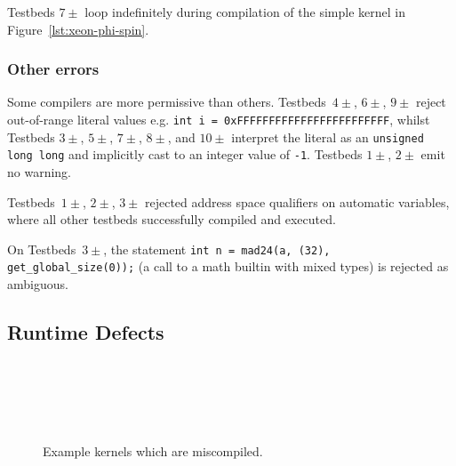 Testbeds $7\pm$ loop indefinitely during compilation of the simple kernel in
Figure~\ref{lst:xeon-phi-spin}.

\subsubsection{Other errors}

Some compilers are more permissive than others. Testbeds~$4\pm$, $6\pm$, $9\pm$
reject out-of-range literal values e.g. \texttt{int i =
0xFFFFFFFFFFFFFFFFFFFFFFFF}, whilst Testbeds $3\pm$, $5\pm$, $7\pm$, $8\pm$, and
$10\pm$ interpret the literal as an \texttt{unsigned long long} and implicitly
cast to an integer value of \texttt{-1}. Testbeds $1\pm$, $2\pm$ emit no
warning.

Testbeds~$1\pm$, $2\pm$, $3\pm$ rejected address space qualifiers on automatic
variables, where all other testbeds successfully compiled and executed.

On Testbeds~$3\pm$, the statement \texttt{int n = mad24(a, (32),
get\_global\_size(0));} (a call to a math builtin with mixed types) is rejected
as ambiguous.

\subsection{Runtime Defects}%
\label{subsec:runtime-defects}

\begin{figure}
  \centering %
  \\%
  \\%
  \\%
  \\%
  \caption{Example kernels which are miscompiled.}%
\end{figure}

